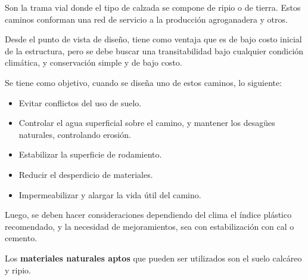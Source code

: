 \documentclass[../main.tex]{subfiles}
\begin{document}
Son la trama vial donde el tipo de calzada se compone de ripio o de tierra.
Estos caminos conforman una red de servicio a la producción agroganadera y
otros.

Desde el punto de vista de diseño, tiene como ventaja que es de bajo costo
inicial de la estructura, pero se debe buscar una transitabilidad bajo cualquier
condición climática, y conservación simple y de bajo costo.

Se tiene como objetivo, cuando se diseña uno de estos caminos, lo siguiente:

\begin{itemize}
  \item Evitar conflictos del uso de suelo.
  \item Controlar el agua superficial sobre el camino, y mantener los 
    desagües naturales, controlando erosión.
  \item Estabilizar la superficie de rodamiento.
  \item Reducir el desperdicio de materiales.
  \item Impermeabilizar y alargar la vida útil del camino.
\end{itemize}

Luego, se deben hacer consideraciones dependiendo del clima el índice plástico
recomendado, y la necesidad de mejoramientos, sea con estabilización con cal
o cemento.

Los \textbf{materiales naturales aptos} que pueden ser utilizados son el
suelo calcáreo y ripio.
\end{document}
